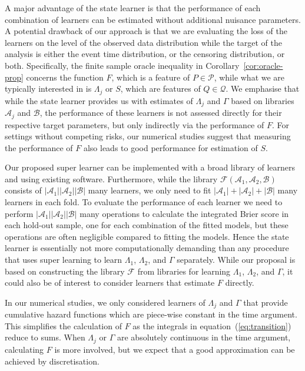 A major advantage of the state learner is that the performance of each
combination of learners can be estimated without additional nuisance
parameters. A potential drawback of our approach is that we are
evaluating the loss of the learners on the level of the observed data
distribution while the target of the analysis is either the event time
distribution, or the censoring distribution, or both.
Specifically, the finite sample oracle inequality in
Corollary~\ref{cor:oracle-prop} concerns the function \( F \), which
is a feature of \( P \in \mathcal{P} \), while what we are typically
interested in is \( \Lambda_j \) or \( S \), which are features of
\( Q \in \mathcal{Q} \). We emphasise that while the state learner
provides us with estimates of \( \Lambda_j \) and $\Gamma$ based on
libraries \( \mathcal{A}_j \) and \( \mathcal{B} \), the performance
of these learners is not assessed directly for their respective target
parameters, but only indirectly via the performance of \( F \).  For
settings without competing risks, our numerical studies suggest that
measuring the performance of \( F \) also leads to good performance
for estimation of \( S \).

Our proposed super learner can be implemented with a broad library of learners
and using existing software.
Furthermore, while
the library \( \mathcal{F}(\mathcal{A}_1,\mathcal{A}_2,\mathcal{B}) \) consists
of \( |\mathcal{A}_1||\mathcal{A}_2||\mathcal{B}| \) many learners, we only need to fit
\( |\mathcal{A}_1| +|\mathcal{A}_2| + |\mathcal{B}| \) many learners in each fold. To
evaluate the performance of each learner we need to perform
\( |\mathcal{A}_1||\mathcal{A}_2||\mathcal{B}| \) many operations to calculate the
integrated Brier score in each hold-out sample, one for each combination of the
fitted models, but these operations are often negligible compared to fitting the
models. Hence the state learner is essentially not more computationally demanding
than any procedure that uses super learning to learn $\Lambda_1$, $\Lambda_2$,
and $\Gamma$ separately. While our proposal is based on constructing the library
\( \mathcal{F} \) from libraries for learning \( \Lambda_1 \), $\Lambda_2$, and
$\Gamma$, it could also be of interest to consider learners that estimate
\( F \) directly.

In our numerical studies, we only considered learners of $\Lambda_j$ and
$\Gamma$ that provide cumulative hazard functions which are piece-wise constant
in the time argument. This simplifies the calculation of \( F \) as the
integrals in equation~(\ref{eq:transition}) reduce to sums. When $\Lambda_j$ or
\( \Gamma \) are absolutely continuous in the time argument, calculating \( F \)
is more involved, but we expect that a good approximation can be achieved by
discretisation.

